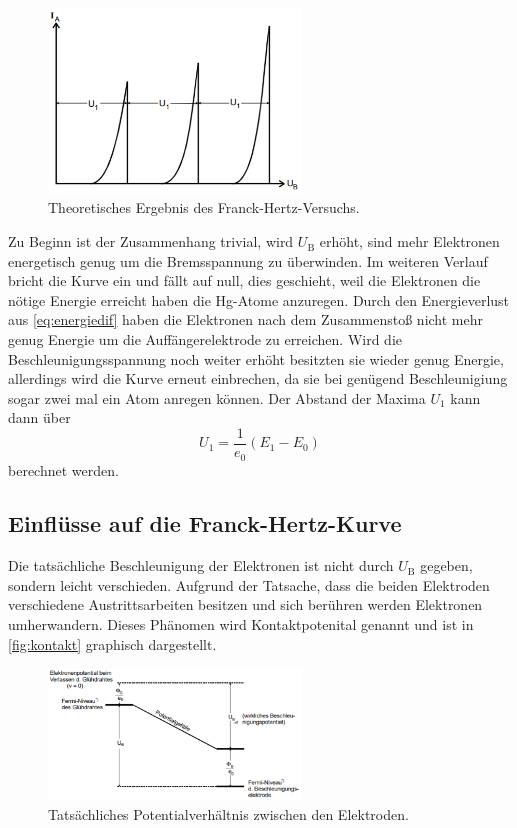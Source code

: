 \begin{figure}
    \centering
    \includegraphics[width=0.6\textwidth]{images/bild2.png}
    \caption{Theoretisches Ergebnis des Franck-Hertz-Versuchs.\cite{V601}}
    \label{fig:kurve}
\end{figure}

Zu Beginn ist der Zusammenhang trivial, wird $U_\text{B}$ erhöht, sind mehr Elektronen energetisch genug um die Bremsspannung zu überwinden.
Im weiteren Verlauf bricht die Kurve ein und fällt auf null, dies geschieht, weil die Elektronen die nötige Energie erreicht haben die Hg-Atome anzuregen.
Durch den Energieverlust aus \autoref{eq:energiedif} haben die Elektronen nach dem Zusammenstoß nicht mehr genug Energie um die Auffängerelektrode zu erreichen. 
Wird die Beschleunigungsspannung noch weiter erhöht besitzten sie wieder genug Energie, allerdings wird die Kurve erneut einbrechen, da sie bei genügend Beschleunigiung sogar zwei mal ein Atom anregen können.
Der Abstand der Maxima $U_1$ kann dann über 
\begin{equation}
    U_1 = \frac{1}{e_0}(E_1 - E_0)
    \label{eq:ueins}
\end{equation}
berechnet werden.

\subsection{Einflüsse auf die Franck-Hertz-Kurve}
\label{ssec:einfluss}

Die tatsächliche Beschleunigung der Elektronen ist nicht durch $U_\text{B}$ gegeben, sondern leicht verschieden.
Aufgrund der Tatsache, dass die beiden Elektroden verschiedene Austrittsarbeiten besitzen und sich berühren werden Elektronen umherwandern.
Dieses Phänomen wird Kontaktpotenital genannt und ist in \autoref{fig:kontakt} graphisch dargestellt.

\begin{figure}
    \centering
    \includegraphics[width=0.6\textwidth]{images/bild3.png}
    \caption{Tatsächliches Potentialverhältnis zwischen den Elektroden.\cite{V601}}
    \label{fig:kontakt}
\end{figure}

